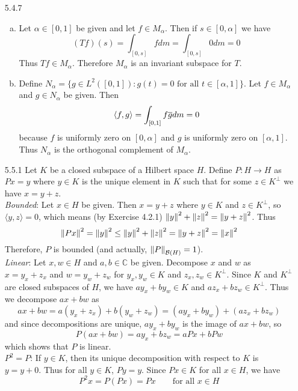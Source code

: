 \documentclass[../../Solutions.tex]{subfiles}
\begin{document}
\begin{itemize}
	\item [5.4.7]
		\begin{enumerate}[(a)]
			\item Let $\alpha\in[0,1]$ be given and let $f \in M_\alpha$. Then if $s \in [0,\alpha]$ we have
				$$ (Tf)(s) = \int_{[0,s]} f dm = \int_{[0,s]} 0 dm = 0 $$
				Thus $Tf \in M_\alpha$. Therefore $M_\alpha$ is an invariant subspace for $T$.
			\item Define $N_\alpha = \{ g \in L^2([0,1]) : g(t) = 0 \text{ for all } t \in [\alpha,1] \}$.
				Let $f \in M_\alpha$ and $g \in N_\alpha$ be given. Then
				$$ \langle f,g \rangle = \int_{[0,1]} f\overline{g} dm = 0 $$
				because $f$ is uniformly zero on $[0,\alpha]$ and $g$ is uniformly zero on $[\alpha,1]$.
				Thus $N_\alpha$ is the orthogonal complement of $M_\alpha$.
		\end{enumerate}
		
	\item [5.5.1] Let $K$ be a closed subspace of a Hilbert space $H$. Define $P:H\to H$ as $Px = y$ where $y \in K$ is the unique element in $K$ such that for some $z \in K^{\bot}$ we have $x = y+z$. \\
		\textit{Bounded}: Let $x \in H$ be given. Then $x = y+z$ where $y\in K$ and $z \in K^{\bot}$, so $\langle y,z \rangle = 0$, which means (by Exercise 4.2.1) $\left\lVert y\right\rVert^2+\left\lVert z\right\rVert^2 = \left\lVert y+z\right\rVert^2$. Thus
		$$ \left\lVert Px\right\rVert^2 = \left\lVert y\right\rVert^2 \leq \left\lVert y\right\rVert^2 + \left\lVert z\right\rVert^2 = \left\lVert y+z\right\rVert^2 = \left\lVert x\right\rVert^2 $$
		Therefore, $P$ is bounded (and actually, $\left\lVert P\right\rVert_{\mathcal{B}(H)} = 1$). \\
		\textit{Linear}: Let $x,w \in H$ and $a,b \in \mathbb{C}$ be given. Decompose $x$ and $w$ as $x=y_x+z_x$ and $w = y_w+z_w$ for $y_x,y_w \in K$ and $z_x,z_w \in K^{\bot}$. Since $K$ and $K^{\bot}$ are closed subspaces of $H$, we have $ay_x+by_w \in K$ and $az_x+bz_w \in K^{\bot}$. Thus we decompose $ax+bw$ as
		$$ ax+bw = a(y_x+z_x)+b(y_w+z_w) = (ay_x+by_w)+(az_x+bz_w) $$
		and since decompositions are unique, $ay_x+by_w$ is the image of $ax+bw$, so
		$$ P(ax+bw) = ay_x+bz_w = aPx+bPw $$
		which shows that $P$ is linear. \\
		$\mathit{P^2=P}$: If $y \in K$, then its unique decomposition with respect to $K$ is $y = y+0$. Thus for all $y \in K$, $Py = y$. Since $Px \in K$ for all $x \in H$, we have
		$$ P^2x = P(Px) = Px \qquad\text{for all } x \in H $$
		
\end{itemize}
\end{document}
